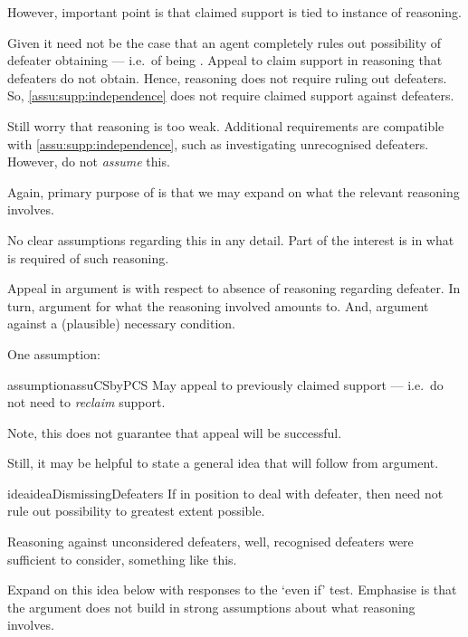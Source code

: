 \begin{note}
  However, important point is that claimed support is tied to instance of reasoning.

  Given \nfcs{} it need not be the case that an agent completely rules out possibility of defeater obtaining --- i.e.\ of being \mom{}.
  Appeal to claim support in reasoning that defeaters do not obtain.
  Hence, reasoning does not require ruling out defeaters.
  So, \autoref{assu:supp:independence} does not require claimed support against defeaters.

  Still worry that reasoning is too weak.
  Additional requirements are compatible with \autoref{assu:supp:independence}, such as investigating unrecognised defeaters.
  However, do not \emph{assume} this.

  Again, primary purpose of \eiS{} is that we may expand on what the relevant reasoning involves.

  No clear assumptions regarding this in any detail.
  Part of the interest is in what is required of such reasoning.

  Appeal in argument is with respect to absence of reasoning regarding defeater.
  In turn, argument for what the reasoning involved amounts to.
  And, argument against a (plausible) necessary condition.

  One assumption:
  \begin{restatable}{assumption}{assuCSbyPCS}\label{assu:appeal-to-previous-CS}
    May appeal to previously claimed support --- i.e.\ do not need to \emph{reclaim} support.
  \end{restatable}

  Note, this does not guarantee that appeal will be successful.

  Still, it may be helpful to state a general idea that will follow from argument.

  \begin{restatable}[]{idea}{ideaDismissingDefeaters}\label{idea:dismissing-defeaters}
    If in position to deal with defeater, then need not rule out possibility to greatest extent possible.

    Reasoning against unconsidered defeaters, well, recognised defeaters were sufficient to consider, something like this.
  \end{restatable}

  Expand on this idea below with responses to the `even if' test.
  Emphasise is that the argument does not build in strong assumptions about what reasoning involves.
\end{note}

